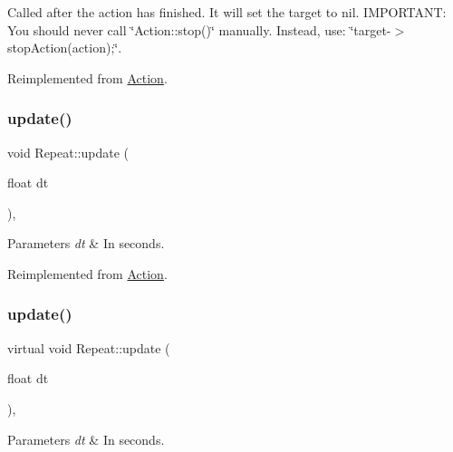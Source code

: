 Called after the action has finished. It will set the \textquotesingle{}target\textquotesingle{} to nil. I\+M\+P\+O\+R\+T\+A\+NT\+: You should never call \char`\"{}\+Action\+::stop()\char`\"{} manually. Instead, use\+: \char`\"{}target-\/$>$stop\+Action(action);\char`\"{}. 

Reimplemented from \hyperlink{classAction_a968267fa7a1dcc46a2976249a712d3c8}{Action}.

\mbox{\label{classRepeat_afc3c9f93a8dae8689f177a250309518f}} 
\subsubsection{\texorpdfstring{update()}{update()}\hspace{0.1cm}{\footnotesize\ttfamily [1/2]}}
{\footnotesize\ttfamily void Repeat\+::update (\begin{DoxyParamCaption}\item[{float}]{dt }\end{DoxyParamCaption})\hspace{0.3cm}{\ttfamily [override]}, {\ttfamily [virtual]}}


\begin{DoxyParams}{Parameters}
{\em dt} & In seconds. \\
\hline
\end{DoxyParams}


Reimplemented from \hyperlink{classAction_a937e646e63915e33ad05ba149bfcf239}{Action}.

\mbox{\label{classRepeat_a0b3bfedf79ce5588ea7fd5e539285086}} 
\subsubsection{\texorpdfstring{update()}{update()}\hspace{0.1cm}{\footnotesize\ttfamily [2/2]}}
{\footnotesize\ttfamily virtual void Repeat\+::update (\begin{DoxyParamCaption}\item[{float}]{dt }\end{DoxyParamCaption})\hspace{0.3cm}{\ttfamily [override]}, {\ttfamily [virtual]}}


\begin{DoxyParams}{Parameters}
{\em dt} & In seconds. \\
\hline
\end{DoxyParams}



